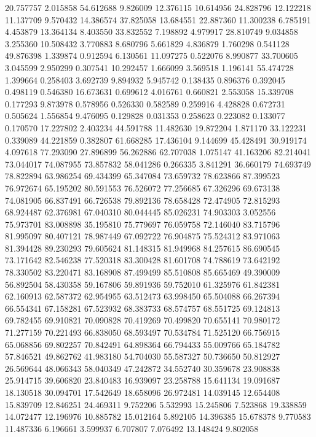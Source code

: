 20.757757
2.015858
54.612688
9.826009
12.376115
10.614956
24.828796
12.122218
11.137709
9.570432
14.386574
37.825058
13.684551
22.887360
11.300238
6.785191
4.453879
13.364134
8.403550
33.832552
7.198892
4.979917
28.810749
9.034858
3.255360
10.508432
3.770883
8.680796
5.661829
4.836879
1.760298
0.541128
49.876398
1.339874
0.912594
6.130561
11.097275
0.522076
8.990877
33.700605
3.045599
2.950299
0.307541
10.292457
1.666099
3.569518
1.196141
55.474728
1.399664
0.258403
3.692739
9.894932
5.945742
0.138435
0.896376
0.392045
0.498119
0.546380
16.673631
0.699612
4.016761
0.660821
2.553058
15.339708
0.177293
9.873978
0.578956
0.526330
0.582589
0.259916
4.428828
0.672731
0.505624
1.556854
9.476095
0.129828
0.031353
0.258623
0.223082
0.133077
0.170570
17.227802
2.403234
44.591788
11.482630
19.872204
1.871170
33.122231
0.339089
44.221859
0.382807
61.668285
17.436104
9.144699
45.428491
30.919174
4.097618
77.293090
27.896899
56.262886
62.707038
1.075147
41.163206
82.214041
73.044017
74.087955
73.857832
58.041286
0.266335
3.841291
36.660179
74.693749
78.822894
63.986254
69.434399
65.347084
73.659732
78.623866
87.399523
76.972674
65.195202
80.591553
76.526072
77.256685
67.326296
69.673138
74.081905
66.837491
66.726538
79.892136
78.658428
72.474905
72.815293
68.924487
62.376981
67.040310
80.044445
85.026231
74.903303
3.052556
75.973701
83.008898
35.195810
75.779697
76.059758
72.146040
83.715796
81.995097
80.407121
78.987449
67.092722
76.904875
75.524312
83.971063
81.394428
89.230293
79.605624
81.148315
81.949968
84.257615
86.690545
73.171642
82.546238
77.520318
83.300428
81.601708
74.788619
73.642192
78.330502
83.220471
83.168908
87.499499
85.510808
85.665469
49.390009
56.892504
58.430358
59.167806
59.891936
59.752010
61.325976
61.842381
62.160913
62.587372
62.954955
63.512473
63.998450
65.504088
66.267394
66.554341
67.158281
67.523932
68.383733
68.574757
68.551725
69.124813
69.782455
69.910821
70.090828
70.419269
70.499820
70.655141
70.980172
71.277159
70.221493
66.838050
68.593497
70.534784
71.525120
66.756915
65.068856
69.802257
70.842491
64.898364
66.794433
55.009766
65.184782
57.846521
49.862762
41.983180
54.704030
55.587327
50.736650
50.812927
26.569644
48.066343
58.040349
47.242872
34.552740
30.359678
23.908838
25.914715
39.606820
23.840483
16.939097
23.258788
15.641134
19.091687
18.130518
30.094701
17.542649
18.658096
26.972481
14.039145
12.654408
15.839709
12.846251
24.469311
9.752206
5.532993
15.245806
7.523868
19.338859
14.072477
12.196976
10.885782
15.012164
5.892105
14.396385
15.678378
9.770583
11.487336
6.196661
3.599937
6.707807
7.076492
13.148424
9.802058

